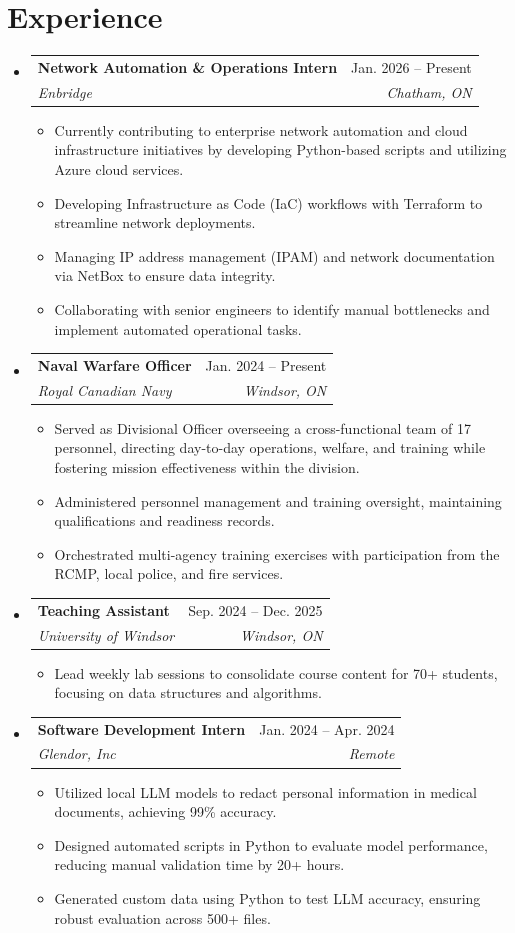 \documentclass[letterpaper,11pt]{article}
\makeatletter
\newcommand{\resumeItem}[1]{
  \item\small{
    {#1 \vspace{-2pt}}
  }
}
\newcommand{\resumeSubheading}[4]{
  \vspace{-2pt}\item
    \begin{tabular*}{0.97\textwidth}[t]{l@{\extracolsep{\fill}}r}
      \textbf{#1} & #2 \\
      \textit{\small#3} & \textit{\small #4} \\
    \end{tabular*}\vspace{-7pt}
}
\newcommand{\resumeSubHeadingListStart}{\begin{itemize}[leftmargin=0.15in, label={}]}
\newcommand{\resumeSubHeadingListEnd}{\end{itemize}\vspace{-8pt}}
\newcommand{\resumeItemListStart}{\begin{itemize}\vspace{-2pt}}
\newcommand{\resumeItemListEnd}{\end{itemize}\vspace{-8pt}}
\makeatother
\begin{document}
\section{Experience}
  \resumeSubHeadingListStart
    \resumeSubheading
      {Network Automation \& Operations Intern}{Jan. 2026 -- Present}
      {Enbridge}{Chatham, ON}
      \resumeItemListStart
        \resumeItem{Currently contributing to enterprise network automation and cloud infrastructure initiatives by developing Python-based scripts and utilizing Azure cloud services.}
        \resumeItem{Developing Infrastructure as Code (IaC) workflows with Terraform to streamline network deployments.}
        \resumeItem{Managing IP address management (IPAM) and network documentation via NetBox to ensure data integrity.}
        \resumeItem{Collaborating with senior engineers to identify manual bottlenecks and implement automated operational tasks.}
      \resumeItemListEnd

    \resumeSubheading
      {Naval Warfare Officer}{Jan. 2024 -- Present}
      {Royal Canadian Navy}{Windsor, ON}
      \resumeItemListStart
        \resumeItem{Served as Divisional Officer overseeing a cross-functional team of 17 personnel, directing day-to-day operations, welfare, and training while fostering mission effectiveness within the division.}
        \resumeItem{Administered personnel management and training oversight, maintaining qualifications and readiness records.}
        \resumeItem{Orchestrated multi-agency training exercises with participation from the RCMP, local police, and fire services.}
      \resumeItemListEnd

    \resumeSubheading
      {Teaching Assistant}{Sep. 2024 -- Dec. 2025}
      {University of Windsor}{Windsor, ON}
      \resumeItemListStart
        \resumeItem{Lead weekly lab sessions to consolidate course content for 70+ students, focusing on data structures and algorithms.}
      \resumeItemListEnd

    \resumeSubheading
      {Software Development Intern}{Jan. 2024 -- Apr. 2024}
      {Glendor, Inc}{Remote}
      \resumeItemListStart
        \resumeItem{Utilized local LLM models to redact personal information in medical documents, achieving 99\% accuracy.}
        \resumeItem{Designed automated scripts in Python to evaluate model performance, reducing manual validation time by 20+ hours.}
        \resumeItem{Generated custom data using Python to test LLM accuracy, ensuring robust evaluation across 500+ files.}
      \resumeItemListEnd
  \resumeSubHeadingListEnd
\end{document}
